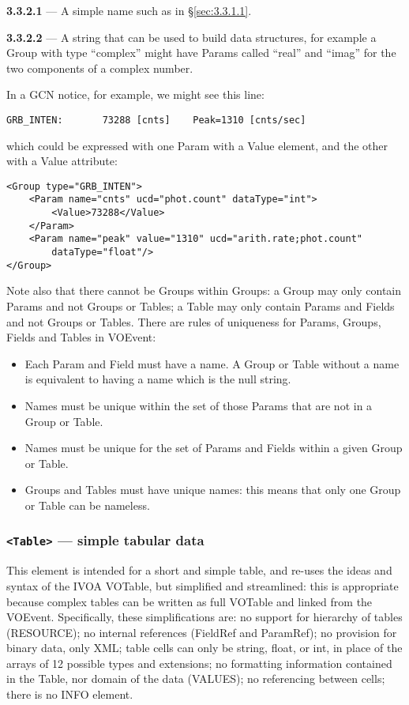 \documentclass[11pt,a4paper]{ivoa}
\begin{document}
\noindent \textbf{3.3.2.1} \label{sec:3.3.2.1} --- A simple name such as
in \S\ref{sec:3.3.1.1}.

\noindent \textbf{3.3.2.2} \label{sec:3.3.2.2} --- A string that can be
used to build data structures, for example a Group with type ``complex'' might
have Params called ``real'' and ``imag'' for the two components of a complex
number.

In a GCN notice, for example, we might see this line:
\begin{lstlisting}
GRB_INTEN:       73288 [cnts]    Peak=1310 [cnts/sec]
\end{lstlisting}
which could be expressed with one Param with a Value element, and the other with
a Value attribute:
\begin{lstlisting}
<Group type="GRB_INTEN">
    <Param name="cnts" ucd="phot.count" dataType="int">
        <Value>73288</Value>
    </Param>
    <Param name="peak" value="1310" ucd="arith.rate;phot.count"
        dataType="float"/>
</Group>
\end{lstlisting}
Note also that there cannot be Groups within Groups: a Group may only contain
Params and not Groups or Tables; a Table may only contain Params and Fields and
not Groups or Tables. There are rules of uniqueness for Params, Groups, Fields
and Tables in VOEvent:
\begin{itemize}
\item Each Param and Field must have a name. A Group or Table without a name is
equivalent to having a name which is the null string.
\item Names must be unique within the set of those Params that are not in a
Group or Table.
\item Names must be unique for the set of Params and Fields within a given Group
or Table.
\item Groups and Tables must have unique names: this means that only one Group
or Table can be nameless.
\end{itemize}

\subsubsection{\texttt{<Table>} --- simple tabular data}
\label{sec:3.3.3}
This element is intended for a short and simple table, and re-uses the ideas and
syntax of the IVOA VOTable, but simplified and streamlined: this is appropriate
because complex tables can be written as full VOTable and linked from the
VOEvent. Specifically, these simplifications are: no support for hierarchy of
tables (RESOURCE); no internal references (FieldRef and ParamRef); no provision
for binary data, only XML; table cells can only be string, float, or int, in
place of the arrays of 12 possible types and extensions; no formatting
information contained in the Table, nor domain of the data (VALUES); no
referencing between cells; there is no INFO element.
\end{document}
